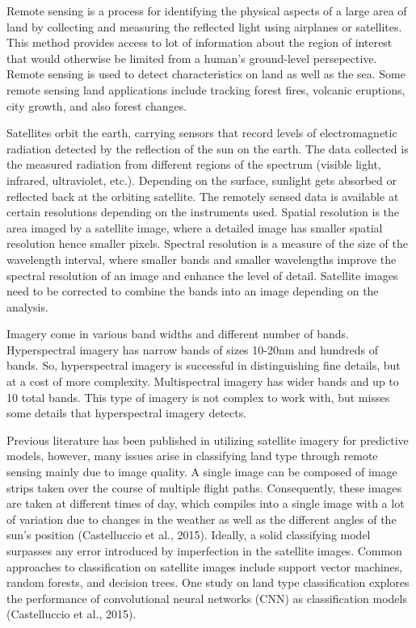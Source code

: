 \documentclass[12pt,twoside]{reedthesis}
\begin{document}
Remote sensing is a process for identifying the physical aspects of a large area of land by collecting and measuring the reflected light using airplanes or satellites. This method provides access to lot of information about the region of interest that would otherwise be limited from a human's ground-level persepective. Remote sensing is used to detect characteristics on land as well as the sea. Some remote sensing land applications include tracking forest fires, volcanic eruptions, city growth, and also forest changes.

Satellites orbit the earth, carrying sensors that record levels of electromagnetic radiation detected by the reflection of the sun on the earth. The data collected is the measured radiation from different regions of the spectrum (visible light, infrared, ultraviolet, etc.). Depending on the surface, sunlight gets absorbed or reflected back at the orbiting satellite. The remotely sensed data is available at certain resolutions depending on the instruments used. Spatial resolution is the area imaged by a satellite image, where a detailed image has smaller spatial resolution hence smaller pixels. Spectral resolution is a measure of the size of the wavelength interval, where smaller bands and smaller wavelengths improve the spectral resolution of an image and enhance the level of detail. Satellite images need to be corrected to combine the bands into an image depending on the analysis.

Imagery come in various band widths and different number of bands. Hyperspectral imagery has narrow bands of sizes 10-20nm and hundreds of bands. So, hyperspectral imagery is successful in distinguishing fine details, but at a cost of more complexity. Multispectral imagery has wider bands and up to 10 total bands. This type of imagery is not complex to work with, but misses some details that hyperspectral imagery detects.

Previous literature has been published in utilizing satellite imagery for predictive models, however, many issues arise in classifying land type through remote sensing mainly due to image quality. A single image can be composed of image strips taken over the course of multiple flight paths. Consequently, these images are taken at different times of day, which compiles into a single image with a lot of variation due to changes in the weather as well as the different angles of the sun's position (Castelluccio et al., 2015). Ideally, a solid classifying model surpasses any error introduced by imperfection in the satellite images. Common approaches to classification on satellite images include support vector machines, random forests, and decision trees. One study on land type classification explores the performance of convolutional neural networks (CNN) as classification models (Castelluccio et al., 2015).
\end{document}

